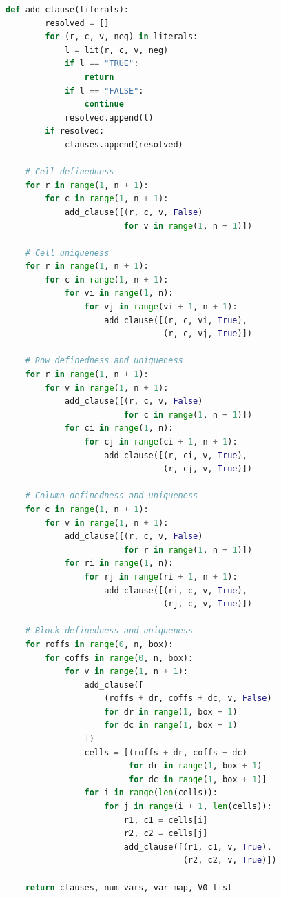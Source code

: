 \documentclass[12pt]{article}
\begin{document}
\begin{lstlisting}[language=Python, caption={Compact CNF encoding following Kwon and Jain}]
    def add_clause(literals):
        resolved = []
        for (r, c, v, neg) in literals:
            l = lit(r, c, v, neg)
            if l == "TRUE":
                return
            if l == "FALSE":
                continue
            resolved.append(l)
        if resolved:
            clauses.append(resolved)

    # Cell definedness
    for r in range(1, n + 1):
        for c in range(1, n + 1):
            add_clause([(r, c, v, False)
                        for v in range(1, n + 1)])

    # Cell uniqueness
    for r in range(1, n + 1):
        for c in range(1, n + 1):
            for vi in range(1, n):
                for vj in range(vi + 1, n + 1):
                    add_clause([(r, c, vi, True),
                                (r, c, vj, True)])

    # Row definedness and uniqueness
    for r in range(1, n + 1):
        for v in range(1, n + 1):
            add_clause([(r, c, v, False)
                        for c in range(1, n + 1)])
            for ci in range(1, n):
                for cj in range(ci + 1, n + 1):
                    add_clause([(r, ci, v, True),
                                (r, cj, v, True)])

    # Column definedness and uniqueness
    for c in range(1, n + 1):
        for v in range(1, n + 1):
            add_clause([(r, c, v, False)
                        for r in range(1, n + 1)])
            for ri in range(1, n):
                for rj in range(ri + 1, n + 1):
                    add_clause([(ri, c, v, True),
                                (rj, c, v, True)])

    # Block definedness and uniqueness
    for roffs in range(0, n, box):
        for coffs in range(0, n, box):
            for v in range(1, n + 1):
                add_clause([
                    (roffs + dr, coffs + dc, v, False)
                    for dr in range(1, box + 1)
                    for dc in range(1, box + 1)
                ])
                cells = [(roffs + dr, coffs + dc)
                         for dr in range(1, box + 1)
                         for dc in range(1, box + 1)]
                for i in range(len(cells)):
                    for j in range(i + 1, len(cells)):
                        r1, c1 = cells[i]
                        r2, c2 = cells[j]
                        add_clause([(r1, c1, v, True),
                                    (r2, c2, v, True)])

    return clauses, num_vars, var_map, V0_list
\end{lstlisting}
\end{document}
